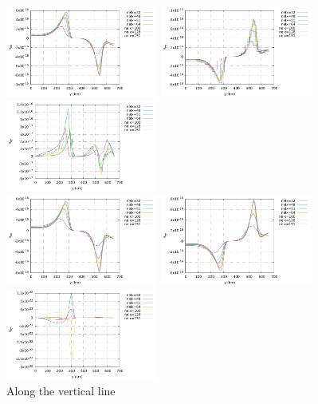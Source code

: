 \begin{center}
\includegraphics[width=5cm]{python_codes/fieldstone_26/results/case2a/vertical_exx.pdf}
\includegraphics[width=5cm]{python_codes/fieldstone_26/results/case2a/vertical_eyy.pdf}
\includegraphics[width=5cm]{python_codes/fieldstone_26/results/case2a/vertical_exy.pdf}\\
\includegraphics[width=5cm]{python_codes/fieldstone_26/results/case2a/vertical_exxn.pdf}
\includegraphics[width=5cm]{python_codes/fieldstone_26/results/case2a/vertical_eyyn.pdf}
\includegraphics[width=5cm]{python_codes/fieldstone_26/results/case2a/vertical_exyn.pdf}\\
{\captionfont Along the vertical line}
\end{center}






